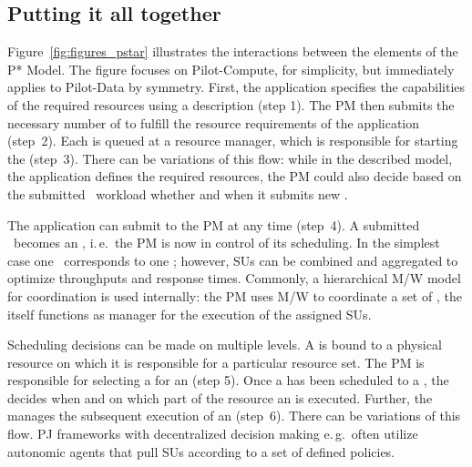 \documentclass[conference]{IEEEtran}
\begin{document}
\subsection{Putting it all together}   

Figure~\ref{fig:figures_pstar} illustrates the interactions between the
elements of the P* Model.  The figure focuses on Pilot-Compute, for
simplicity, but immediately applies to Pilot-Data by symmetry.  First, the
application specifies the capabilities of the required resources using a
\pilotjob description (step 1). The PM then submits the necessary number of
\pilots to fulfill the resource requirements of the application (step~2). Each
\pilot is queued at a resource manager, which is responsible for starting
the \pilot (step~3). There can be variations of this flow: while in the
described model, the application defines the required resources, the PM could
also decide based on the submitted \cu \ workload whether and when it submits
new \pilots.


The application can submit \cus to the PM at any time (step~4). A submitted
\cu \ becomes an \su, i.\,e.\ the PM is now in control of its scheduling. In
the simplest case one \cu \ corresponds to one \su; however, SUs can be
combined and aggregated to optimize throughputs and response times. Commonly,
a hierarchical M/W model for coordination is used internally: the PM uses M/W
to coordinate a set of \pilots, the \pilot itself functions as manager for the
execution of the assigned SUs.

Scheduling decisions can be made on multiple levels. A \pilot is bound
to a physical resource on which it is responsible for a particular
resource set. The PM is responsible for selecting a \pilot for an \su
(step 5). Once a \su has been scheduled to a \pilot, the \pilot decides
when and on which part of the resource an \su is executed.  Further,
the \pilot manages the subsequent execution of an \su (step~6).  There
can be variations of this flow.  PJ frameworks with decentralized
decision making e.\,g.\ often utilize autonomic agents that %
pull SUs according to a set of defined policies.
\end{document}

